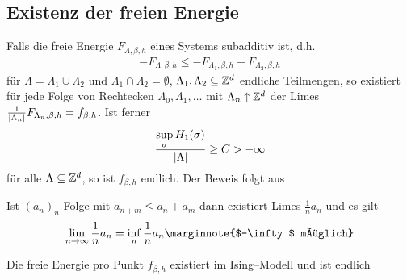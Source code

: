  \subsection*{Existenz der freien Energie} 
 Falls die freie Energie $F_{\Lambda, \beta, h} $ eines Systems subadditiv ist, d.h. 
 \begin{align}
 	- F_{\Lambda, \beta, h} \leq -F_{\Lambda_1, \beta, h} - F_{\Lambda_2, \beta, h}
 \end{align}
 für $\Lambda = \Lambda_1 \cup \Lambda_2$ und $\Lambda_1 \cap \Lambda_2 = \emptyset$, $\Lambda_1, \Lambda_2 \subseteq \mathbb{Z}^d$ endliche Teilmengen, so existiert für jede Folge von Rechtecken $\Lambda_0, \Lambda_1, \dots$ mit $\Lambda_n \uparrow \mathbb{Z}^d$ der Limes $\frac{1}{\lvert\Lambda_n\rvert} F_{\Lambda_n, \beta, h} = f_{\beta,h}$. Ist ferner 
 \begin{align}
 	\frac{\sup\limits_{\sigma} H_1(\sigma) }{\lvert\Lambda\rvert} \geq C > - \infty
 \end{align}
 für alle $\Lambda \subseteq \mathbb{Z}^d$, so ist $f_{\beta,h}$ endlich. Der Beweis folgt aus
 \begin{lemma}
 	Ist $(a_n)_n$ Folge mit $a_{n+m} \leq a_n + a_m$ dann existiert Limes $\frac{1}{n} a_n$ und es gilt 
 	\begin{align}
 		\lim\limits_{n \to \infty} \frac{1}{n} a_n = \inf\limits_{n} \frac{1}{n} a_n \marginnote{$-\infty$ möglich}
 	\end{align}  	
 \end{lemma}
 \begin{korollar}
 Die freie Energie pro Punkt $f_{\beta,h}$ existiert im Ising--Modell und ist endlich	
 \end{korollar}
